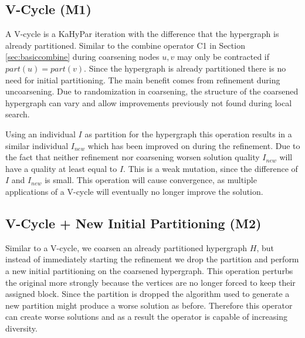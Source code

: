 \documentclass[a4paper,12pt,titlepage, BCOR7mm,headsepline]{scrbook}
\numberwithin{equation}{section}
\begin{document}
\subsection{V-Cycle (M1)}
\label{sec:vcycles}
A V-cycle is a KaHyPar iteration with the difference that the hypergraph is already partitioned. Similar to the combine operator C1 in Section \ref{sec:basiccombine} during coarsening nodes $u,v$ may only be contracted if $part(u) = part(v)$. Since the hypergraph is already partitioned there is no need for initial partitioning. The main benefit comes from refinement during uncoarsening. Due to randomization in coarsening, the structure of the coarsened hypergraph can vary and allow improvements previously not found during local search.

Using an individual $I$ as partition for the hypergraph this operation results in a similar individual $I_{new}$ which has been improved on during the refinement. Due to the fact that neither refinement nor coarsening worsen solution quality $I_{new}$ will have a quality at least equal to $I$. This is a weak mutation, since the difference of $I$ and $I_{new}$ is small. This operation will cause convergence, as multiple applications of a V-cycle will eventually no longer improve the solution.
\subsection{V-Cycle + New Initial Partitioning (M2)}
Similar to a V-cycle, we coarsen an already partitioned hypergraph $H$, but instead of immediately starting the refinement we drop the partition and perform a new initial partitioning on the coarsened hypergraph. This operation perturbs the original more strongly because the vertices are no longer forced to keep their assigned block. Since the partition is
dropped the algorithm used to generate a new partition might produce a worse solution as before. Therefore this operator can create worse solutions and as a result the operator is capable of increasing diversity. 
\end{document}
